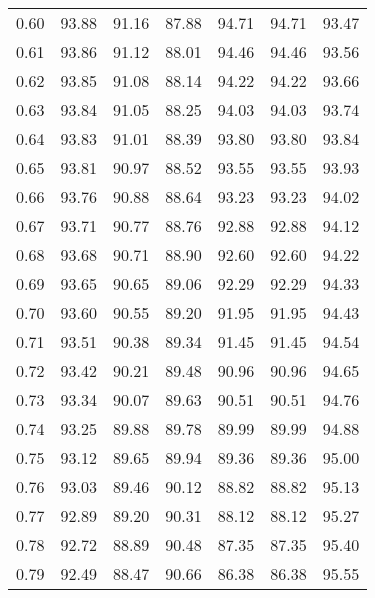 \begin{tabular}{|c|c|c|c|c|c|c|}
      0.60 &     93.88 &     91.16 &      87.88 &   94.71 &      94.71 &         93.47 \\
      0.61 &     93.86 &     91.12 &      88.01 &   94.46 &      94.46 &         93.56 \\
      0.62 &     93.85 &     91.08 &      88.14 &   94.22 &      94.22 &         93.66 \\
      0.63 &     93.84 &     91.05 &      88.25 &   94.03 &      94.03 &         93.74 \\
      0.64 &     93.83 &     91.01 &      88.39 &   93.80 &      93.80 &         93.84 \\
      0.65 &     93.81 &     90.97 &      88.52 &   93.55 &      93.55 &         93.93 \\
      0.66 &     93.76 &     90.88 &      88.64 &   93.23 &      93.23 &         94.02 \\
      0.67 &     93.71 &     90.77 &      88.76 &   92.88 &      92.88 &         94.12 \\
      0.68 &     93.68 &     90.71 &      88.90 &   92.60 &      92.60 &         94.22 \\
      0.69 &     93.65 &     90.65 &      89.06 &   92.29 &      92.29 &         94.33 \\
      0.70 &     93.60 &     90.55 &      89.20 &   91.95 &      91.95 &         94.43 \\
      0.71 &     93.51 &     90.38 &      89.34 &   91.45 &      91.45 &         94.54 \\
      0.72 &     93.42 &     90.21 &      89.48 &   90.96 &      90.96 &         94.65 \\
      0.73 &     93.34 &     90.07 &      89.63 &   90.51 &      90.51 &         94.76 \\
      0.74 &     93.25 &     89.88 &      89.78 &   89.99 &      89.99 &         94.88 \\
      0.75 &     93.12 &     89.65 &      89.94 &   89.36 &      89.36 &         95.00 \\
      0.76 &     93.03 &     89.46 &      90.12 &   88.82 &      88.82 &         95.13 \\
      0.77 &     92.89 &     89.20 &      90.31 &   88.12 &      88.12 &         95.27 \\
      0.78 &     92.72 &     88.89 &      90.48 &   87.35 &      87.35 &         95.40 \\
      0.79 &     92.49 &     88.47 &      90.66 &   86.38 &      86.38 &         95.55 \\

\end{tabular}
